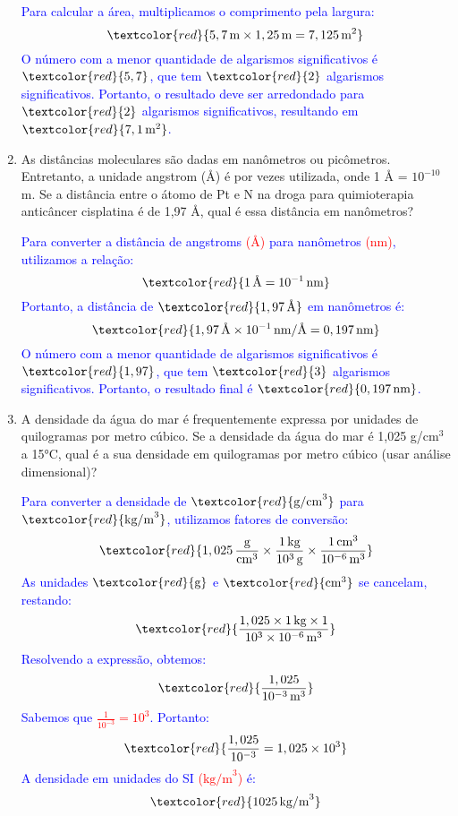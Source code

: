 \documentclass[a4paper, 12pt]{article}
\begin{document}
\begin{enumerate}
          \textcolor{blue}{
              Para calcular a área, multiplicamos o comprimento pela largura:
              \[
                  \textcolor{red}{5,7 \, \text{m} \times 1,25 \, \text{m} = 7,125 \, \text{m}^2}
              \]
              O número com a menor quantidade de algarismos significativos é \(\textcolor{red}{5,7}\), que tem \(\textcolor{red}{2}\) algarismos significativos. Portanto, o resultado deve ser arredondado para \(\textcolor{red}{2}\) algarismos significativos, resultando em \(\textcolor{red}{7,1 \, \text{m}^2}\).
          }

    \item As distâncias moleculares são dadas em nanômetros ou picômetros. Entretanto, a unidade angstrom (Å) é por vezes utilizada, onde 1 Å = \(10^{-10}\) m. Se a distância entre o átomo de Pt e N na droga para quimioterapia anticâncer cisplatina é de 1,97 Å, qual é essa distância em nanômetros?

          \textcolor{blue}{
              Para converter a distância de angstroms \textcolor{red}{(\(\text{Å}\))} para nanômetros \textcolor{red}{(\(\text{nm}\))}, utilizamos a relação:
              \[
                  \textcolor{red}{1 \, \text{Å} = 10^{-1} \, \text{nm}}
              \]
              Portanto, a distância de \(\textcolor{red}{1,97 \, \text{Å}}\) em nanômetros é:
              \[
                  \textcolor{red}{1,97 \, \text{Å} \times 10^{-1} \, \text{nm/Å} = 0,197 \, \text{nm}}
              \]
              O número com a menor quantidade de algarismos significativos é \(\textcolor{red}{1,97}\), que tem \(\textcolor{red}{3}\) algarismos significativos. Portanto, o resultado final é \(\textcolor{red}{0,197 \, \text{nm}}\).
          }
    \item A densidade da água do mar é frequentemente expressa por unidades de quilogramas por metro cúbico. Se a densidade da água do mar é 1,025 g/cm\(^3\) a 15°C, qual é a sua densidade em quilogramas por metro cúbico (usar análise dimensional)?

          \textcolor{blue}{
              Para converter a densidade de \(\textcolor{red}{\text{g/cm}^3}\) para \(\textcolor{red}{\text{kg/m}^3}\), utilizamos fatores de conversão:
              \[
                  \textcolor{red}{1,025 \, \frac{\text{g}}{\text{cm}^3} \times \frac{1 \, \text{kg}}{10^3 \, \text{g}} \times \frac{1 \, \text{cm}^3}{10^{-6} \, \text{m}^3}}
              \]
              As unidades \(\textcolor{red}{\text{g}}\) e \(\textcolor{red}{\text{cm}^3}\) se cancelam, restando:
              \[
                  \textcolor{red}{\frac{1,025 \times 1 \, \text{kg} \times 1}{10^3 \times 10^{-6} \, \text{m}^3}}
              \]
              Resolvendo a expressão, obtemos:
              \[
                  \textcolor{red}{\frac{1,025}{10^{-3} \, \text{m}^3}}
              \]
              Sabemos que \textcolor{red}{\( \frac{1}{10^{-3}} = 10^3 \)}. Portanto:
              \[
                  \textcolor{red}{\frac{1,025}{10^{-3}} = 1,025 \times 10^3}
              \]
              A densidade em unidades do SI \textcolor{red}{(\(\text{kg/m}^3\))} é:
              \[
                  \textcolor{red}{1025 \, \text{kg/m}^3}
              \]
          }


\end{enumerate}
\end{document}
